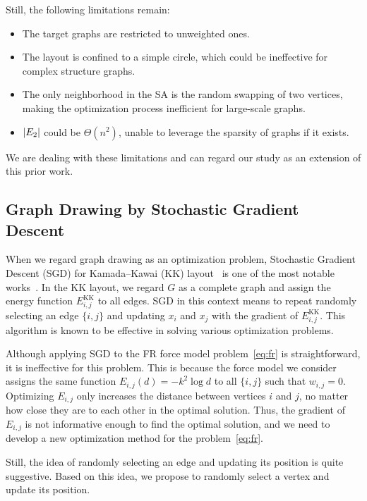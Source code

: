 \documentclass[dvipdfmx,10pt,journal,compsoc]{IEEEtran}
\begin{document}
Still, the following limitations remain:
\begin{itemize}
  \item The target graphs are restricted to unweighted ones.
  \item The layout is confined to a simple circle, which could be ineffective for complex structure graphs.
  \item The only neighborhood in the SA is the random swapping of two vertices, making the optimization process inefficient for large-scale graphs.
  \item $\abs{E_2}$ could be $\Theta(n^2)$, unable to leverage the sparsity of graphs if it exists.
\end{itemize}
We are dealing with these limitations and can regard our study as an extension of this prior work.

\subsection{Graph Drawing by Stochastic Gradient Descent}\label{ssec:sgd}

When we regard graph drawing as an optimization problem, Stochastic Gradient Descent (SGD) for Kamada--Kawai (KK) layout~\cite{kamadaAlgorithmDrawingGeneral1989} is one of the most notable works~\cite{zhengGraphDrawingStochastic2019}.
In the KK layout, we regard $G$ as a complete graph and assign the energy function $E_{i,j}^{\mathrm{KK}}$ to all edges.
SGD in this context means to repeat randomly selecting an edge $\{ i,j \}$ and updating $x_i$ and $x_j$ with the gradient of $E_{i,j}^{\mathrm{KK}}$. This algorithm is known to be effective in solving various optimization problems.

Although applying SGD to the FR force model problem~\eqref{eq:fr} is straightforward, it is ineffective for this problem.
This is because the force model we consider assigns the same function $E_{i,j}(d)=-k^2\log{d}$ to all $\{i,j\}$ such that $w_{i,j}=0$. Optimizing $E_{i,j}$ only increases the distance between vertices $i$ and $j$, no matter how close they are to each other in the optimal solution. Thus, the gradient of $E_{i,j}$ is not informative enough to find the optimal solution, and we need to develop a new optimization method for the problem~\eqref{eq:fr}.

Still, the idea of randomly selecting an edge and updating its position is quite suggestive. Based on this idea, we propose to randomly select a vertex and update its position.
\end{document}
